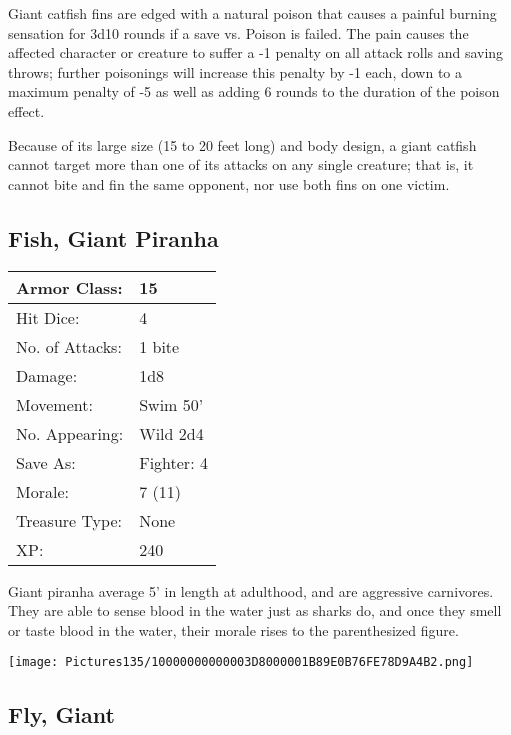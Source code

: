 \documentclass[a4paper,twoside,openany,10pt]{book}
\begin{document}
\begin{multicols}{2}
Giant catfish fins are edged with a natural poison that causes a painful burning sensation for 3d10 rounds if a save vs. Poison is failed. The pain causes the affected character or creature to suffer a -1 penalty on all attack rolls and saving throws; further poisonings will increase this penalty by -1 each, down to a maximum penalty of -5 as well as adding 6 rounds to the duration of the poison effect.

Because of its large size (15 to 20 feet long) and body design, a giant catfish cannot target more than one of its attacks on any single creature; that is, it cannot bite and fin the same opponent, nor use both fins on one victim.

\subsection*{Fish, Giant Piranha}\label{fish-giant-piranha}

\begin{tabularx}{0.48\textwidth}{@{}lX@{}}
Armor Class: & 15 \\\hline
Hit Dice: & 4 \\\hline
No. of Attacks: & 1 bite \\\hline
Damage: & 1d8 \\\hline
Movement: & Swim 50' \\\hline
No. Appearing: & Wild 2d4 \\\hline
Save As: & Fighter: 4 \\\hline
Morale: & 7 (11) \\\hline
Treasure Type: & None \\\hline
XP: & 240 \\\hline
\end{tabularx}\medskip


Giant piranha average 5' in length at adulthood, and are aggressive carnivores. They are able to sense blood in the water just as sharks do, and once they smell or taste blood in the water, their morale rises to the parenthesized figure.

\begin{center}
	\texttt{[image: Pictures135/10000000000003D8000001B89E0B76FE78D9A4B2.png]}
\end{center}

\subsection*{Fly, Giant}\label{fly-giant}


\end{multicols}
\end{document}
